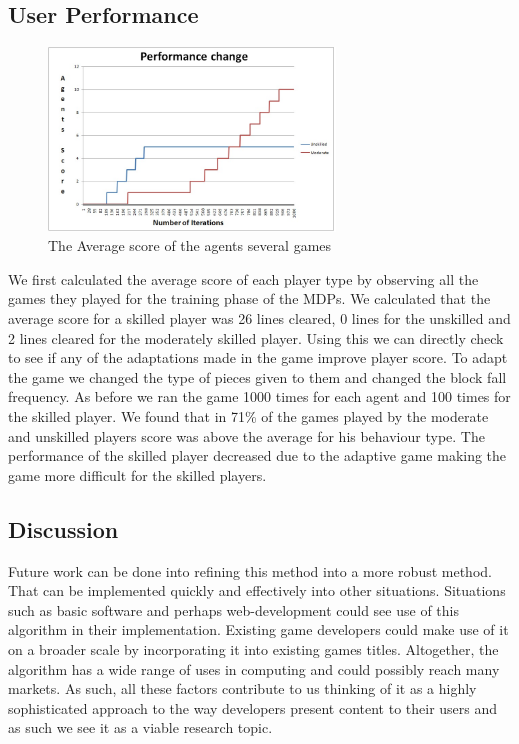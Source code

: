 \documentclass[11pt, conference, compsoc]{IEEEtran}
\let\MYoriglatexcaption\caption
\renewcommand{\caption}[2][\relax]{\MYoriglatexcaption[#2]{#2}}
\begin{document}
\subsection*{User Performance}
\FloatBarrier
\begin{figure}[!h]
	\centering
	\includegraphics[width=3in]{s.jpg}
	\caption{The Average score of the agents several games}
	\label{Figure 5}
\end{figure}
\FloatBarrier
We first calculated the average score of each player type by observing all the games they played for the training phase of the MDPs. We calculated that the average score for a skilled player was 26 lines cleared, 0 lines for the unskilled and 2 lines cleared for the moderately skilled player. Using this we can directly check to see if any of the adaptations made in the game improve player score. To adapt the game we changed the type of pieces given to them and changed the block fall frequency. As before we ran the game 1000 times for each agent and 100 times for the skilled player. We found that in 71\% of the games played by the moderate and unskilled players score was above the average for his behaviour type. The performance of the skilled player decreased due to the adaptive game making the game more difficult for the skilled players.


\subsection{   Discussion}
Future work can be done into refining this method into a more robust method. That can be implemented quickly and effectively into other situations. Situations such as basic software and perhaps web-development could see use of this algorithm in their implementation. Existing game developers could make use of it on a broader scale by incorporating it into existing games titles. Altogether, the algorithm has a wide range of uses in computing and could possibly reach many markets. As such, all these factors contribute to us thinking of it as a highly sophisticated approach to the way developers present content to their users and as such we see it as a viable research topic.
\end{document}
